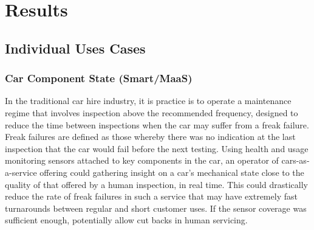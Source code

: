 \documentclass[journal]{IEEEtran}
\begin{document}
\section{Results}




\subsection{Individual Uses Cases}

\subsubsection{Car Component State (Smart/MaaS)}

In the traditional car hire industry, it is practice is to operate a
maintenance regime that involves inspection above the recommended
frequency, designed to reduce the time between inspections when the
car may suffer from a freak failure. Freak failures are defined as
those whereby there was no indication at the last inspection that the
car would fail before the next testing. Using health and usage
monitoring sensors attached to key components in the car, an operator
of cars-as-a-service offering could gathering insight on a car's
mechanical state close to the quality of that offered by a human
inspection, in real time. This could drastically reduce the rate of
freak failures in such a service that may have extremely fast
turnarounds between regular and short customer uses. If the sensor
coverage was sufficient enough, potentially allow cut backs in human
servicing.
\end{document}
